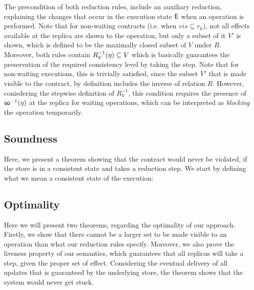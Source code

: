 The precondition of both reduction rules, include an auxiliary
reduction, explaining the changes that occur in the execution state ${\normalfont \textsf{E}}$
when an operation is performed. Note that for non-waiting contracts
(i.e. when $vis\subseteq r_k$), 
not all effects available at the replica are shown to the operation, but
only a subset of it $V'$ is shown, which is defined to be the  maximally
closed subset of $V$ under $R$.
Moreover, both rules contain
$R_V^{-1}(\eta)\subseteq V$ which is basically guarantees the
preservation of the required consistency level by taking the step. Note
that for non-waiting executions, this is trivially satisfied, since the
subset $V'$ that is made visible to the contract, by definition includes
the inverse of relation $R$. However, conisdering the stepwise
definition of $R_V^{-1}$, this condition requires the presence of
${\normalfont \textsf{so}}^{-1}(\eta)$ at the replica for waiting operations, which can be
interpreted as \emph{blocking} the operation temporarily.







\subsection{Soundness}
Here, we present a theorem showing that the contract would never be
violated, if the store is in a consistent state and takes a reduction
step. We start by defining what we mean a consistent state of the
execution: 



\subsection{Optimality}
Here we will present two theorems, regarding the optimality of our
approach. Firstly, we show that there
cannot be a larger set to be made visible to an operation than what
our reduction rules specify. Moreover, we also prove the liveness property
of our semantics, which guarantees that all replicas will take a step,
given the proper set of effect. Considering the eventual delivery of all
updates that is guaranteed by the underlying store, the theorem shows that the system would never get
stuck.




